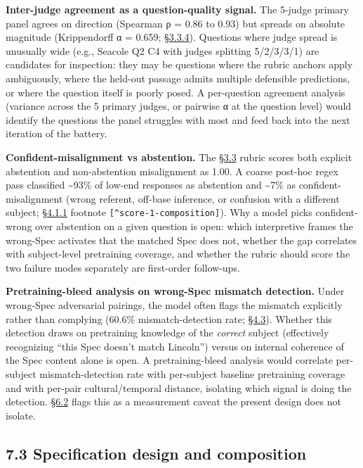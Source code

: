 \textbf{Inter-judge agreement as a question-quality signal.} The 5-judge
primary panel agrees on direction (Spearman ρ = 0.86 to 0.93) but
spreads on absolute magnitude (Krippendorff α = 0.659; \hyperref[inter-judge-agreement]{§3.3.4}).
Questions where judge spread is unusually wide (e.g., Seacole Q2 C4 with
judges splitting 5/2/3/3/1) are candidates for inspection: they may be
questions where the rubric anchors apply ambiguously, where the held-out
passage admits multiple defensible predictions, or where the question
itself is poorly posed. A per-question agreement analysis (variance
across the 5 primary judges, or pairwise α at the question level) would
identify the questions the panel struggles with most and feed back into
the next iteration of the battery.

\textbf{Confident-misalignment vs abstention.} The \hyperref[scoring-rubric-with-calibrated-llm-judge-panel]{§3.3} rubric scores
both explicit abstention and non-abstention misalignment as 1.00. A
coarse post-hoc regex pass classified \textasciitilde93\% of low-end
responses as abstention and \textasciitilde7\% as confident-misalignment
(wrong referent, off-base inference, or confusion with a different
subject; \hyperref[per-question-baseline-engagement-and-the-worked-rubric-example]{§4.1.1} footnote \texttt{{[}\^{}score-1-composition{]}}). Why a
model picks confident-wrong over abstention on a given question is open:
which interpretive frames the wrong-Spec activates that the matched Spec
does not, whether the gap correlates with subject-level pretraining
coverage, and whether the rubric should score the two failure modes
separately are first-order follow-ups.

\textbf{Pretraining-bleed analysis on wrong-Spec mismatch detection.}
Under wrong-Spec adversarial pairings, the model often flags the
mismatch explicitly rather than complying (60.6\% mismatch-detection
rate; \hyperref[mechanism-correct-content-not-format]{§4.3}). Whether this detection draws on pretraining knowledge of
the \emph{correct} subject (effectively recognizing ``this Spec doesn't
match Lincoln'') versus on internal coherence of the Spec content alone
is open. A pretraining-bleed analysis would correlate per-subject
mismatch-detection rate with per-subject baseline pretraining coverage
and with per-pair cultural/temporal distance, isolating which signal is
doing the detection. \hyperref[measurement-apparatus]{§6.2} flags this as a measurement caveat the present
design does not isolate.

\hypertarget{specification-design-and-composition}{%
\subsection{7.3 Specification design and
composition}\label{specification-design-and-composition}}

